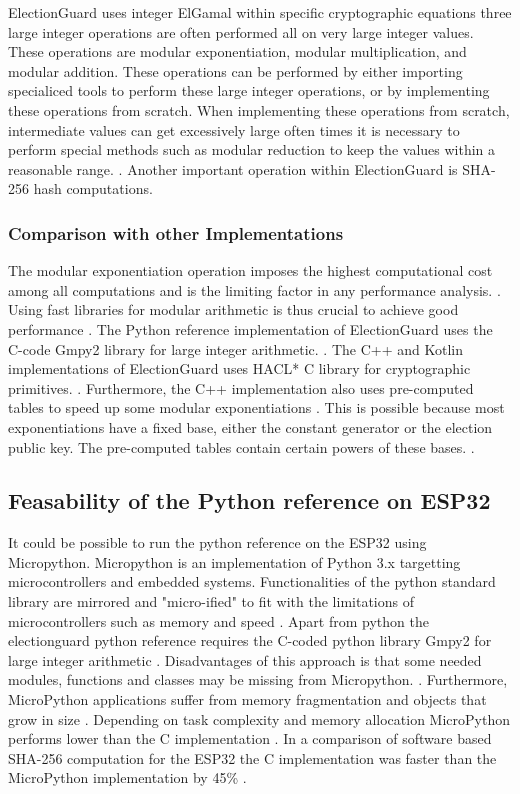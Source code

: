 ElectionGuard uses integer ElGamal within specific cryptographic equations three large integer operations are often performed all on very large integer values. These operations are modular exponentiation, modular multiplication, and modular addition. These operations can be performed by either importing specialiced tools to perform these large integer operations, or by implementing these operations from scratch. When implementing these operations from scratch, intermediate values can get excessively large often times it is necessary to perform special methods such as modular reduction to keep the values within a reasonable range.  \cite[21, 25-26]{eg-spec}. Another important operation within ElectionGuard is SHA-256 hash computations. 

\subsubsection{Comparison with other Implementations}
The modular exponentiation operation imposes the highest computational cost among all computations and is the limiting factor in any performance analysis. \cite[22]{eg-spec}. Using fast libraries for modular arithmetic is thus crucial to achieve good performance \cite[22]{eg-paper}. The Python reference implementation of ElectionGuard uses the C-code Gmpy2 library for large integer arithmetic. \cite{eg-docs}. \cite{esp32-ref} The C++ and Kotlin implementations of ElectionGuard uses HACL* C library for cryptographic primitives. \cite{eg-docs}. Furthermore, the C++ implementation also uses pre-computed tables to speed up some modular exponentiations \cite{eg-docs}. This is possible because most exponentiations have a fixed base, either the constant generator or the election public key. The pre-computed tables contain certain powers of these bases. \cite{eg-docs}.

\subsection{Feasability of the Python reference on ESP32}
It could be possible to run the python reference on the ESP32 using Micropython. Micropython is an implementation of Python 3.x targetting microcontrollers and embedded systems. Functionalities of the python standard library are mirrored and "micro-ified" to fit with the limitations of microcontrollers such as memory and speed \cite{micropython} \cite[234]{9292199}. Apart from python the electionguard python reference requires the C-coded python library Gmpy2 for large integer arithmetic \cite{eg-ref}. Disadvantages of this approach is that some needed modules, functions and classes may be missing from Micropython. \cite{micropython}. Furthermore, MicroPython applications suffer from memory fragmentation and objects that grow in size \cite[234]{9292199}. Depending on task complexity and memory allocation MicroPython performs lower than the C implementation \cite[237]{9292199}. In a comparison of software based SHA-256 computation for the ESP32 the C implementation was faster than the MicroPython implementation by 45\% \cite[237]{9292199}. 

